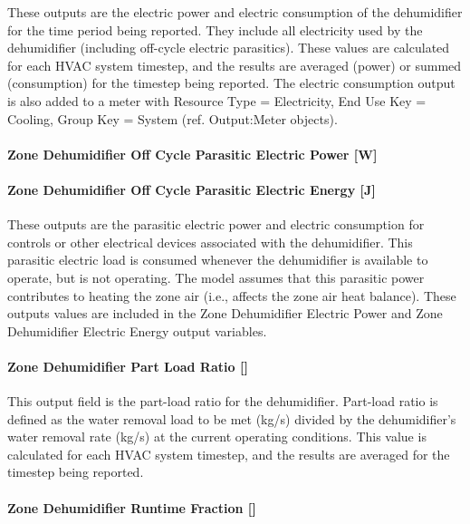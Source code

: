 These outputs are the electric power and electric consumption of the dehumidifier for the time period being reported. They include all electricity used by the dehumidifier (including off-cycle electric parasitics). These values are calculated for each HVAC system timestep, and the results are averaged (power) or summed (consumption) for the timestep being reported. The electric consumption output is also added to a meter with Resource Type = Electricity, End Use Key = Cooling, Group Key = System (ref. Output:Meter objects).

\paragraph{Zone Dehumidifier Off Cycle Parasitic Electric Power {[}W{]}}\label{zone-dehumidifier-off-cycle-parasitic-electric-power-w}

\paragraph{Zone Dehumidifier Off Cycle Parasitic Electric Energy {[}J{]}}\label{zone-dehumidifier-off-cycle-parasitic-electric-energy-j}

These outputs are the parasitic electric power and electric consumption for controls or other electrical devices associated with the dehumidifier. This parasitic electric load is consumed whenever the dehumidifier is available to operate, but is not operating. The model assumes that this parasitic power contributes to heating the zone air (i.e., affects the zone air heat balance). These outputs values are included in the Zone Dehumidifier Electric Power and Zone Dehumidifier Electric Energy output variables.

\paragraph{Zone Dehumidifier Part Load Ratio {[]}}\label{zone-dehumidifier-part-load-ratio}

This output field is the part-load ratio for the dehumidifier. Part-load ratio is defined as the water removal load to be met (kg/s) divided by the dehumidifier's water removal rate (kg/s) at the current operating conditions. This value is calculated for each HVAC system timestep, and the results are averaged for the timestep being reported.

\paragraph{Zone Dehumidifier Runtime Fraction {[]}}\label{zone-dehumidifier-runtime-fraction}

